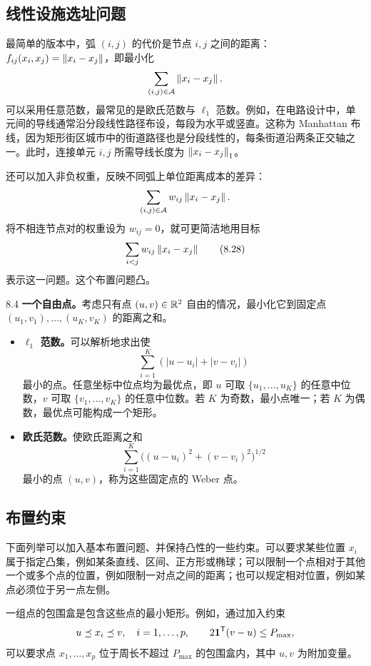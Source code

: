 \subsection{线性设施选址问题}
最简单的版本中，弧 $(i,j)$ 的代价是节点 $i,j$ 之间的距离：$f_{ij}(x_i,x_j)=\left\lVert x_i-x_j\right\rVert$，即最小化
\[\sum_{(i,j)\in\mathcal A}\left\lVert x_i-x_j\right\rVert.\]
可以采用任意范数，最常见的是欧氏范数与 $\ell_1$ 范数。例如，在电路设计中，单元间的导线通常沿分段线性路径布设，每段为水平或竖直。这称为 Manhattan 布线，因为矩形街区城市中的街道路径也是分段线性的，每条街道沿两条正交轴之一。此时，连接单元 $i,j$ 所需导线长度为 $\left\lVert x_i-x_j\right\rVert_1$。

还可以加入非负权重，反映不同弧上单位距离成本的差异：
\[\sum_{(i,j)\in\mathcal A}w_{ij}\left\lVert x_i-x_j\right\rVert.\]
将不相连节点对的权重设为 $w_{ij}=0$，就可更简洁地用目标
\begin{equation}\sum_{i<j}w_{ij}\left\lVert x_i-x_j\right\rVert\tag{8.28}\end{equation}
表示这一问题。这个布置问题凸。
\begin{origexample}{8.4}
\textbf{一个自由点。}考虑只有点 $(u,v)\in\mathbb R^2$ 自由的情况，最小化它到固定点 $(u_1,v_1),\ldots,(u_K,v_K)$ 的距离之和。
\begin{itemize}
\item \textbf{$\ell_1$ 范数。}可以解析地求出使
\[\sum_{i=1}^K(|u-u_i|+|v-v_i|)\]
最小的点。任意坐标中位点均为最优点，即 $u$ 可取 $\{u_1,\ldots,u_K\}$ 的任意中位数，$v$ 可取 $\{v_1,\ldots,v_K\}$ 的任意中位数。若 $K$ 为奇数，最小点唯一；若 $K$ 为偶数，最优点可能构成一个矩形。
\item \textbf{欧氏范数。}使欧氏距离之和
\[\sum_{i=1}^K\bigl((u-u_i)^2+(v-v_i)^2\bigr)^{1/2}\]
最小的点 $(u,v)$，称为这些固定点的 Weber 点。
\end{itemize}
\end{origexample}
\subsection{布置约束}
下面列举可以加入基本布置问题、并保持凸性的一些约束。可以要求某些位置 $x_i$ 属于指定凸集，例如某条直线、区间、正方形或椭球；可以限制一个点相对于其他一个或多个点的位置，例如限制一对点之间的距离；也可以规定相对位置，例如某点必须位于另一点左侧。

一组点的包围盒是包含这些点的最小矩形。例如，通过加入约束
\[u\preceq x_i\preceq v,\quad i=1,\ldots,p,\qquad2\mathbf 1^\mathsf T(v-u)\leq P_{\max},\]
可以要求点 $x_1,\ldots,x_p$ 位于周长不超过 $P_{\max}$ 的包围盒内，其中 $u,v$ 为附加变量。
